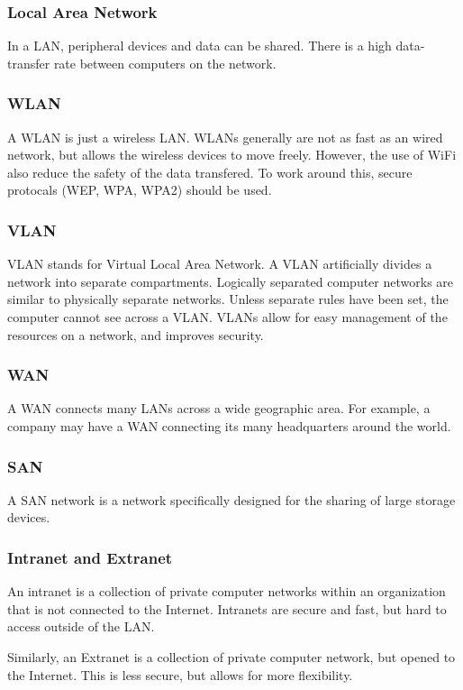 \documentclass[../notes.tex]{subfiles}
\begin{document}
\subsubsection{Local Area Network}
In a LAN, peripheral devices and data can be shared.
There is a high data-transfer rate between computers on the network.

\subsubsection{WLAN}
A WLAN is just a wireless LAN.
WLANs generally are not as fast as an wired network, but allows the wireless devices to move freely.
However, the use of WiFi also reduce the safety of the data transfered. 
To work around this, secure protocals (WEP, WPA, WPA2) should be used.

\subsubsection{VLAN}
VLAN stands for Virtual Local Area Network.
A VLAN artificially divides a network into separate compartments.
Logically separated computer networks are similar to physically separate networks.
Unless separate rules have been set, the computer cannot see across a VLAN.
VLANs allow for easy management of the resources on a network, and improves security.

\subsubsection{WAN}
A WAN connects many LANs across a wide geographic area.
For example, a company may have a WAN connecting its many headquarters around the world.

\subsubsection{SAN}
A SAN network is a network specifically designed for the sharing of large storage devices.

\subsubsection{Intranet and Extranet}
An intranet is a collection of private computer networks within an organization that is not connected to the Internet.
Intranets are secure and fast, but hard to access outside of the LAN.

Similarly, an Extranet is a collection of private computer network, but opened to the Internet.
This is less secure, but allows for more flexibility.
\end{document}
